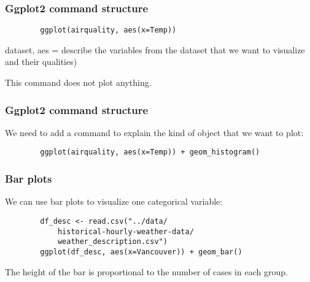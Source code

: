 \documentclass{beamer}
\begin{document}
	\begin{frame}[fragile]
		\frametitle{Ggplot2 command structure}

		\begin{exampleblock}{}
		\begin{center}
		\begin{BVerbatim}
		ggplot(airquality, aes(x=Temp))
		\end{BVerbatim}
		\end{center}
		\end{exampleblock}{}

dataset, aes = describe the variables from the dataset that we want to visualize and their qualities)

		This command does not plot anything.

	\end{frame}

	\begin{frame}[fragile]
		\frametitle{Ggplot2 command structure}

		We need to add a command to explain the kind of object that we want to plot:

		\begin{exampleblock}{}
		\begin{center}
		\begin{BVerbatim}
		ggplot(airquality, aes(x=Temp)) + geom_histogram()
		\end{BVerbatim}
		\end{center}
		\end{exampleblock}{}
		
	\end{frame}

	\begin{frame}[fragile]
		\frametitle{Bar plots}

		We can use bar plots to visualize one categorical variable:

		\begin{exampleblock}{}
		\begin{center}
		\begin{BVerbatim}
		df_desc <- read.csv("../data/
		    historical-hourly-weather-data/
		    weather_description.csv")
		ggplot(df_desc, aes(x=Vancouver)) + geom_bar()
		\end{BVerbatim}
		\end{center}
		\end{exampleblock}{}

		The height of the bar is proportional to the number of cases in each group.
		
	\end{frame}
\end{document}
